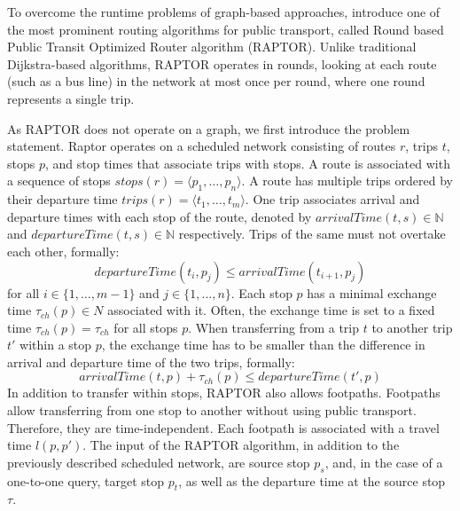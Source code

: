 To overcome the runtime problems of graph-based approaches,  introduce one of the most prominent routing algorithms for public transport, called Round based Public Transit Optimized Router algorithm (RAPTOR). %
Unlike traditional Dijkstra-based algorithms, RAPTOR operates in rounds, looking at each route (such as a bus line) in the network at most once per round, where one round represents a single trip.

As RAPTOR does not operate on a graph, we first introduce the problem statement.
Raptor operates on a scheduled network consisting of routes \(r\), trips \(t\), stops \(p\), and stop times that associate trips with stops.
A route is associated with a sequence of stops \(stops(r) = \langle p_1, \dots, p_n \rangle\).
A route has multiple trips ordered by their departure time \(trips(r) = \langle t_1, \dots, t_m \rangle\).
One trip associates arrival and departure times with each stop of the route, denoted by \(arrivalTime(t, s) \in \mathbb{N}\) and \(departureTime(t, s) \in \mathbb{N}\) respectively.
Trips of the same must not overtake each other, formally:
\[departureTime(t_i, p_j) \leq arrivalTime(t_{i+1}, p_j)\]
for all \(i \in \{1, \dots, m-1\}\) and \(j \in \{1, \dots, n\}\).
Each stop \(p\) has a minimal exchange time \(\tau_{ch}(p) \in N\) associated with it.
Often, the exchange time is set to a fixed time \(\tau_{ch}(p) = \tau_{ch}\) for all stops \(p\).
When transferring from a trip \(t\) to another trip \(t' \) within a stop \(p\), the exchange time has to be smaller than the difference in arrival and departure time of the two trips, formally:
\[arrivalTime(t, p) + \tau_{ch}(p) \leq departureTime(t', p) \]
In addition to transfer within stops, RAPTOR also allows footpaths.
Footpaths allow transferring from one stop to another without using public transport. Therefore, they are time-independent.
Each footpath is associated with a travel time \(l(p, p')\).
The input of the RAPTOR algorithm, in addition to the previously described scheduled network, are source stop \(p_s\), and, in the case of a one-to-one query, target stop \(p_t\), as well as the departure time at the source stop \(\tau\).

